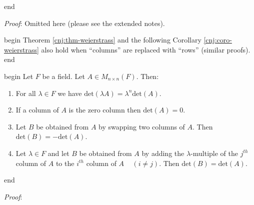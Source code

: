 \documentclass[
  12pt,
  a4paper,
  twoside]{article}
\providecommand{\tightlist}{%
  \setlength{\itemsep}{0pt}\setlength{\parskip}{0pt}}
\theoremstyle{plain}
\theoremstyle{definition}
\begin{document}
\csname end

\emph{Proof}: Omitted here (please see the extended notes).

\csname begin\label{cnj:rmrk-weier}
Theorem \ref{cnj:thm-weierstrass} and the following Corollary \ref{cnj:coro-weierstrass} also hold when ``columns'' are replaced with ``rows'' (similar proofs).
\csname end

\csname begin\label{cnj:coro-weierstrass}
Let \(F\) be a field. Let \(A \in M_{n \times n}(F)\). Then:

\begin{enumerate}
\def\labelenumi{(\alph{enumi})}
\tightlist
\item
  For all \(\lambda \in F\) we have \(\mathrm{det}(\lambda A) = \lambda^{n}\mathrm{det}(A)\).
\item
  If a column of \(A\) is the zero column then \(\mathrm{det}(A) = 0\).
\item
  Let \(B\) be obtained from \(A\) by swapping two columns of \(A\). Then \(\mathrm{det}(B) = -\mathrm{det}(A)\).
\item
  Let \(\lambda \in F\) and let \(B\) be obtained from \(A\) by adding the \(\lambda\)-multiple of the \(j^{th}\) column of \(A\) to the \(i^{th}\) column of \(A\) ~ \((i \neq j)\). Then \(\mathrm{det}(B) = \mathrm{det}(A)\).
\end{enumerate}

\csname end

\emph{Proof}:
\end{document}

